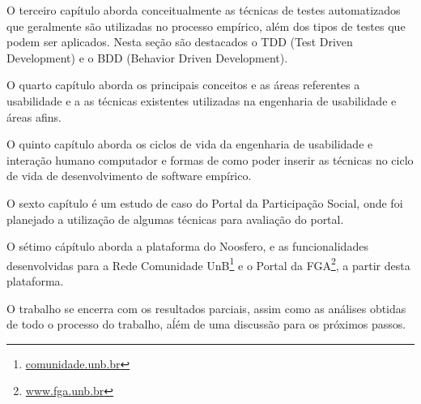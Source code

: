O terceiro capítulo aborda conceitualmente as técnicas de testes automatizados que geralmente são utilizadas no processo empírico, além dos tipos de testes que podem ser aplicados. Nesta seção são destacados o TDD (Test Driven Development) e o BDD (Behavior Driven Development).

O quarto capítulo aborda os principais conceitos e as áreas referentes a usabilidade e a as técnicas existentes utilizadas na engenharia de usabilidade e áreas afins.

O quinto capítulo aborda os ciclos de vida da engenharia de usabilidade e interação humano computador e formas de como poder inserir as técnicas no ciclo de vida de desenvolvimento de software empírico.

O sexto capítulo é um estudo de caso do Portal da Participação Social, onde foi planejado a utilização de algumas técnicas para avaliação do portal.

O sétimo cápítulo aborda a plataforma do Noosfero, e as funcionalidades desenvolvidas para a Rede Comunidade UnB\footnote{\url{comunidade.unb.br}} e o Portal da FGA\footnote{\url{www.fga.unb.br}}, a partir desta plataforma.

O trabalho se encerra com os resultados parciais, assim como as análises obtidas de todo o processo do trabalho, aĺém de uma discussão para os próximos passos.

	


